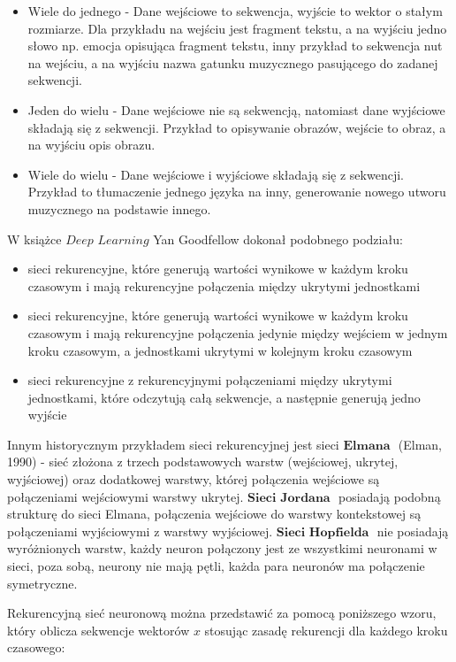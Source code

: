 	
	\begin{itemize}
		\item Wiele do jednego - Dane wejściowe to sekwencja, wyjście to wektor o stałym rozmiarze. Dla przykładu na wejściu jest fragment tekstu, a na wyjściu jedno słowo np. emocja opisująca fragment tekstu, inny przykład to sekwencja nut na wejściu, a na wyjściu nazwa gatunku muzycznego pasującego do zadanej sekwencji.
		\item Jeden do wielu - Dane wejściowe nie są sekwencją, natomiast dane wyjściowe składają się z sekwencji. Przykład to opisywanie obrazów, wejście to obraz, a na wyjściu opis obrazu.
		\item Wiele do wielu - Dane wejściowe i wyjściowe składają się z sekwencji. Przykład to tłumaczenie jednego języka na inny, generowanie nowego utworu muzycznego na podstawie innego. 
	\end{itemize}

	W książce $\textit{Deep Learning}$ Yan Goodfellow dokonał podobnego podziału:
	
	\begin{itemize}
		\item sieci rekurencyjne, które generują wartości wynikowe w każdym kroku czasowym i mają rekurencyjne połączenia między ukrytymi jednostkami
		\item sieci rekurencyjne, które generują wartości wynikowe w każdym kroku czasowym i mają rekurencyjne połączenia jedynie między wejściem w jednym kroku czasowym, a jednostkami ukrytymi w kolejnym kroku czasowym
		\item sieci rekurencyjne z rekurencyjnymi połączeniami między ukrytymi jednostkami, które odczytują całą sekwencje, a następnie generują jedno wyjście
	\end{itemize}                 
	
		 Innym historycznym przykładem sieci rekurencyjnej jest sieci $\textbf{Elmana }$ (Elman, 1990) - sieć złożona z trzech podstawowych warstw (wejściowej, ukrytej, wyjściowej) oraz dodatkowej warstwy, której połączenia wejściowe są połączeniami wejściowymi warstwy ukrytej.
		 $\textbf{Sieci Jordana }$ posiadają podobną strukturę do sieci Elmana, połączenia wejściowe do warstwy kontekstowej są połączeniami wyjściowymi z warstwy wyjściowej.
		 $\textbf{Sieci Hopfielda }$ nie posiadają wyróżnionych warstw, każdy neuron połączony jest ze wszystkimi neuronami w sieci, poza sobą, neurony nie mają pętli, każda para neuronów ma połączenie symetryczne.

	Rekurencyjną sieć neuronową można przedstawić za pomocą poniższego wzoru, który oblicza sekwencje wektorów $x$ stosując zasadę rekurencji dla każdego kroku czasowego:
	
